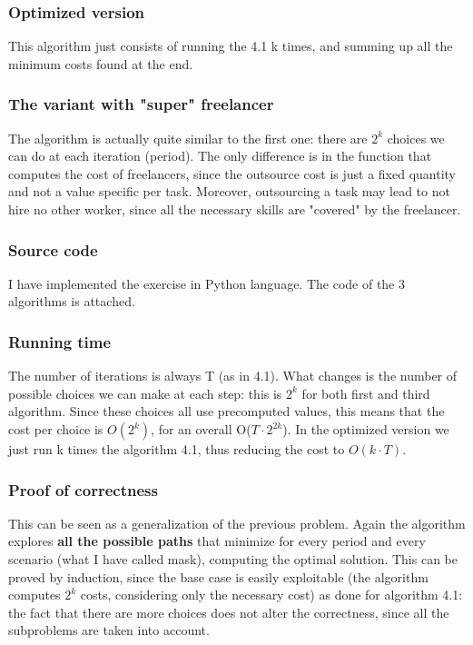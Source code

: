 \subsubsection{Optimized version}
This algorithm just consists of running the 4.1 k times, and summing up all the minimum costs found at the end.

\subsubsection{The variant with "super" freelancer}
The algorithm is actually quite similar to the first one: there are $2^k$ choices we can do at each iteration (period). The only difference is in the function that computes the cost of freelancers, since the outsource cost is just a fixed quantity and not a value specific per task. Moreover, outsourcing a task may lead to not hire no other worker, since all the necessary skills are "covered" by the freelancer.

\subsubsection{Source code}
I have implemented the exercise in Python language. The code of the 3 algorithms is attached.

\subsubsection{Running time}
The number of iterations is always T (as in 4.1). What changes is the number of possible choices we can make at each step: this is $2^k$ for both first and third algorithm. Since these choices all use precomputed values, this means that the cost per choice is $O(2^k)$, for an overall O($T \cdot 2^{2k}$). In the optimized version we just run k times the algorithm 4.1, thus reducing the cost to $O(k \cdot T)$.

\subsubsection{Proof of correctness}
This can be seen as a generalization of the previous problem. Again the algorithm explores \textbf{all the possible paths} that minimize for every period and every scenario (what I have called mask), computing the optimal solution. This can be proved by induction, since the base case is easily exploitable (the algorithm computes $2^k$ costs, considering only the necessary cost) as done for algorithm 4.1: the fact that there are more choices does not alter the correctness, since all the subproblems are taken into account. 


